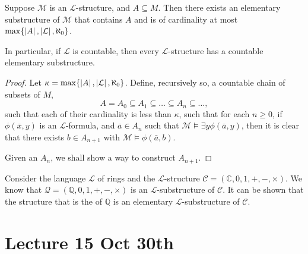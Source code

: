 \documentclass[notoc,notitlepage]{tufte-book}
\begin{document}
\begin{thm}\label{thm:downward_lowenhein_skolem}
  Suppose $\mathcal{M}$ is an $\mathcal{L}$-structure, and $A \subseteq M$. Then there exists an elementary substructure of $\mathcal{M}$ that contains $A$ and is of cardinality at most $\max\{ \left|A\right|, \left|\mathcal{L}\right|, \aleph_0 \}$.

  In particular, if $\mathcal{L}$ is countable, then every $\mathcal{L}$-structure has a countable elementary substructure.
\end{thm}

\begin{proof}
  Let $\kappa = \max \{ \left| A \right|, \left| \mathcal{L} \right|, \aleph_0 \}$. Define, recursively so, a countable chain of subsets of $M$,
  \begin{equation*}
    A = A_0 \subseteq A_1 \subseteq \hdots \subseteq A_n \subseteq \hdots,
  \end{equation*}
  such that each of their cardinality is less than $\kappa$, such that for each $n \geq 0$, if $\phi(\bar{x}, y)$ is an $\mathcal{L}$-formula, and $\bar{a} \in A_n$ such that $\mathcal{M} \models \exists y \phi(\bar{a}, y)$, then it is clear that there exists $b \in A_{n + 1}$ with $\mathcal{M} \models \phi(\bar{a}, b)$.

  Given an $A_n$, we shall show a way to construct $A_{n + 1}$.  
\end{proof}

\begin{eg}
  Consider the language $\mathcal{L}$ of rings and the $\mathcal{L}$-structure $\mathcal{C} = (\mathbb{C}, 0, 1, +, -, \times)$. We know that $\mathcal{Q} = (\mathbb{Q}, 0, 1, +, -, \times)$ is an $\mathcal{L}$-substructure of $\mathcal{C}$. It can be shown that the structure that is the  of $\mathbb{Q}$ is an elementary $\mathcal{L}$-substructure of $\mathcal{C}$.
\end{eg}




\chapter{Lecture 15 Oct 30th}%
\label{chp:lecture_15_oct_30th}
\end{document}

